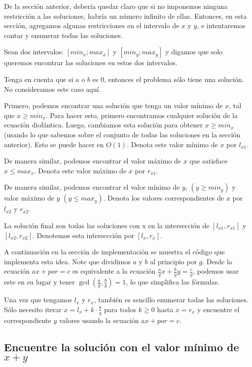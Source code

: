 De la sección anterior, debería quedar claro que si no imponemos ninguna restricción a las soluciones, habría un número infinito de ellas. Entonces, en esta sección, agregamos algunas restricciones en el intervalo de $x$ y $y$, e intentaremos contar y enumerar todas las soluciones.

Sean dos intervalos: $[min_x; max_x]$ y $[min_y; max_y]$ y digamos que solo queremos encontrar las soluciones en estos dos intervalos.

Tenga en cuenta que si $a$ o $b$ es $0$, entonces el problema sólo tiene una solución. No consideramos este caso aquí.

Primero, podemos encontrar una solución que tenga un valor mínimo de $x$, tal que $x \ge min_x$. Para hacer esto, primero encontramos cualquier solución de la ecuación diofántica. Luego, cambiamos esta solución para obtener $x \ge min_x$ (usando lo que sabemos sobre el conjunto de todas las soluciones en la sección anterior). Esto se puede hacer en $O(1)$. Denota este valor mínimo de $x$ por $l_{x1}$.

De manera similar, podemos encontrar el valor máximo de $x$ que satisface $x \le max_x$. Denota este valor máximo de $x$ por $r_{x1}$.

De manera similar, podemos encontrar el valor mínimo de $y$, $(y \ge min_y)$ y valor máximo de $y$ $(y\le max_y)$. Denota los valores correspondientes de $x$ por $l_{x2}$ y $r_{x2}$.

La solución final son todas las soluciones con x en la intersección de $[l_{x1}, r_{x1}]$ y $[l_{x2}, r_{x2}]$. Denotemos esta intersección por $[l_x,r_x]$.

A continuación en la sección de implementación se muestra el código que implementa esta idea. Note que dividimos $a$ y $b$ al principio por $g$. Desde la ecuación $ax + por = c$ es equivalente a la ecuación $\frac{a}{g} x + \frac{b}{g} y = \frac{c}{g}$, podemos usar este en su lugar y tener $\gcd(\frac{a}{g}, \frac{b}{g}) = 1$, lo que simplifica las fórmulas.

Una vez que tengamos $l_x$ y $r_x$, también es sencillo enumerar todas las soluciones. Sólo necesito iterar
$x = l_x + k \cdot \frac{b}{g}$ para todos $k\ge 0$ hasta $x = r_x$ y encuentre el correspondiente $y$ valores usando la ecuación $ax + por = c$.

\subsection{Encuentre la solución con el valor mínimo de $x+y$}


